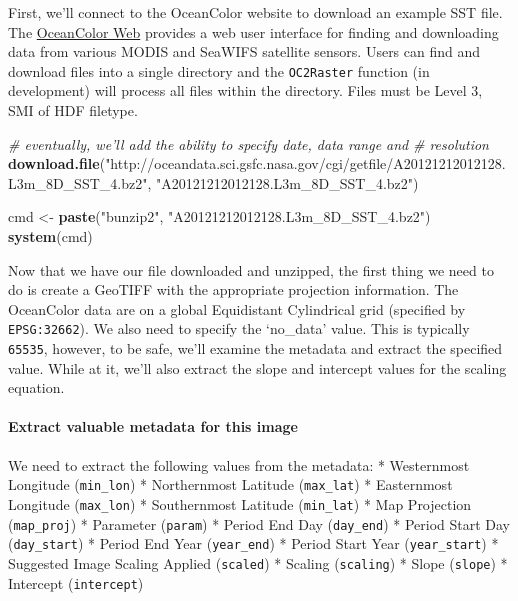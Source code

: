 \documentclass[]{article}
\newenvironment{Shaded}{}{}
\newcommand{\KeywordTok}[1]{\textcolor[rgb]{0.00,0.44,0.13}{\textbf{{#1}}}}
\newcommand{\StringTok}[1]{\textcolor[rgb]{0.25,0.44,0.63}{{#1}}}
\newcommand{\CommentTok}[1]{\textcolor[rgb]{0.38,0.63,0.69}{\textit{{#1}}}}
\newcommand{\NormalTok}[1]{{#1}}
\begin{document}
First, we'll connect to the OceanColor website to download an example
SST file. The \href{http://oceancolor.gsfc.nasa.gov}{OceanColor Web}
provides a web user interface for finding and downloading data from
various MODIS and SeaWIFS satellite sensors. Users can find and download
files into a single directory and the \texttt{OC2Raster} function (in
development) will process all files within the directory. Files must be
Level 3, SMI of HDF filetype.

\begin{Shaded}
\begin{Highlighting}[]
\CommentTok{# eventually, we'll add the ability to specify date, data range and}
\CommentTok{# resolution}
\KeywordTok{download.file}\NormalTok{(}\StringTok{"http://oceandata.sci.gsfc.nasa.gov/cgi/getfile/A20121212012128.L3m_8D_SST_4.bz2"}\NormalTok{, }
    \StringTok{"A20121212012128.L3m_8D_SST_4.bz2"}\NormalTok{)}

\NormalTok{cmd <- }\KeywordTok{paste}\NormalTok{(}\StringTok{"bunzip2"}\NormalTok{, }\StringTok{"A20121212012128.L3m_8D_SST_4.bz2"}\NormalTok{)}
\KeywordTok{system}\NormalTok{(cmd)}
\end{Highlighting}
\end{Shaded}
Now that we have our file downloaded and unzipped, the first thing we
need to do is create a GeoTIFF with the appropriate projection
information. The OceanColor data are on a global Equidistant Cylindrical
grid (specified by \texttt{EPSG:32662}). We also need to specify the
`no\_data' value. This is typically \texttt{65535}, however, to be safe,
we'll examine the metadata and extract the specified value. While at it,
we'll also extract the slope and intercept values for the scaling
equation.

\paragraph{Extract valuable metadata for this image}

We need to extract the following values from the metadata: * Westernmost
Longitude (\texttt{min\_lon}) * Northernmost Latitude
(\texttt{max\_lat}) * Easternmost Longitude (\texttt{max\_lon}) *
Southernmost Latitude (\texttt{min\_lat}) * Map Projection
(\texttt{map\_proj}) * Parameter (\texttt{param}) * Period End Day
(\texttt{day\_end}) * Period Start Day (\texttt{day\_start}) * Period
End Year (\texttt{year\_end}) * Period Start Year (\texttt{year\_start})
* Suggested Image Scaling Applied (\texttt{scaled}) * Scaling
(\texttt{scaling}) * Slope (\texttt{slope}) * Intercept
(\texttt{intercept})
\end{document}
